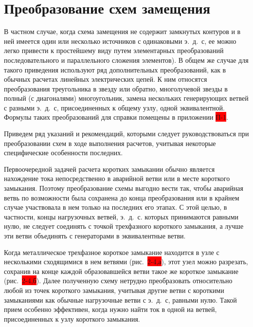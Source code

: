 \section{Преобразование схем замещения}
\label{sec:2-5 preobrazovanie_skhem_zameshcheniia}

В частном случае, когда схема замещения не содержит замкнутых контуров и в ней имеется один или несколько источников с одинаковыми э.~д.~с, ее можно легко привести к простейшему виду путем элементарных преобразований последовательного и параллельного сложения элементов). В общем же случае для такого приведения используют ряд дополнительных преобразований, как в обычных расчетах линейных электрических цепей. К ним относятся преобразования треугольника в звезду или обратно, многолучевой звезды в полный (с диагоналями) многоугольник, замена нескольких генерирующих ветвей с разными э.~д.~с, присоединенных к общему узлу, одной эквивалентной. Формулы таких преобразований для справки помещены в приложении \colorbox{red}{П-1}.

Приведем ряд указаний и рекомендаций, которыми следует руководствоваться при преобразовании схем в ходе выполнения расчетов, учитывая некоторые специфические особенности последних.

Первоочередной задачей расчета коротких замыкании обычно является нахождение тока непосредственно в аварийной ветви или в месте короткого замыкания. Поэтому преобразование схемы выгодно вести так, чтобы аварийная ветвь по возможности была сохранена до конца преобразования или в крайнем случае участвовала в нем только на последних его этапах. С этой целью, в частности, концы нагрузочных ветвей, э.~д.~с. которых принимаются равными нулю, не следует соединять с точкой трехфазного короткого замыкания, а лучше эти ветви объединять с генераторами в эквивалентные ветви.

Когда металлическое трехфазное короткое замыкание находится в узле с несколькими сходящимися в нем ветвями (рис.~\colorbox{red}{2-4,а}), этот узел можно разрезать, сохранив на конце каждой образовавшейся ветви такое же короткое замыкание (рис.~\colorbox{red}{2-4,б}). Далее полученную схему нетрудно преобразовать относительно любой из точек короткого замыкания, учитывая другие ветви с короткими замыканиями как обычные нагрузочные ветви с э.~д.~с, равными нулю. Такой прием особенно эффективен, когда нужно найти ток в одной иа ветвей, присоединенных к узлу короткого замыкания.

